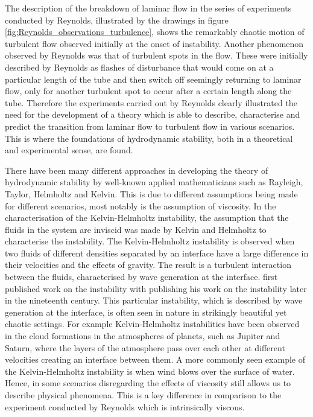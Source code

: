 \documentclass[a4paper, 12pt, twoside, openright]{article}
\numberwithin{equation}{section}
\begin{document}
The description of the breakdown of laminar flow in the series of experiments conducted by Reynolds, illustrated by the drawings in figure \ref{fig;Reynolds_observations_turbulence}, shows the remarkably chaotic motion of turbulent flow observed initially at the onset of instability. Another phenomenon observed by Reynolds was that of turbulent spots in the flow. These were initially described by Reynolds as flashes of disturbance that would come on at a particular length of the tube and then switch off seemingly returning to laminar flow, only for another turbulent spot to occur after a certain length along the tube. Therefore the experiments carried out by Reynolds clearly illustrated the need for the development of a theory which is able to describe, characterise and predict the transition from laminar flow to turbulent flow in various scenarios. This is where the foundations of hydrodynamic stability, both in a theoretical and experimental sense, are found. %

There have been many different approaches in developing the theory of hydrodynamic stability by well-known applied mathematicians such as Rayleigh, Taylor, Helmholtz and Kelvin. This is due to different assumptions being made for different scenarios, most notably is the assumption of viscosity. In the characterisation of the Kelvin-Helmholtz instability, the assumption that the fluids in the system are inviscid was made by Kelvin and Helmholtz to characterise the instability. The Kelvin-Helmholtz instability is observed when two fluids of different densities separated by an interface have a large difference in their velocities and the effects of gravity. The result is a turbulent interaction between the fluids, characterised by wave generation at the interface. \cite{Helmholtz1868} first published work on the instability with \cite{Kelvin1871} publishing his work on the instability later in the nineteenth century. This particular instability, which is described by wave generation at the interface, is often seen in nature in strikingly beautiful yet chaotic settings. For example Kelvin-Helmholtz instabilities have been observed in the cloud formations in the atmospheres of planets, such as Jupiter and Saturn, where the layers of the atmosphere pass over each other at different velocities creating an interface between them. A more commonly seen example of the Kelvin-Helmholtz instability is when wind blows over the surface of water. Hence, in some scenarios disregarding the effects of viscosity still allows us to describe physical phenomena. This is a key difference in comparison to the experiment conducted by Reynolds which is intrinsically viscous. %
\end{document}
